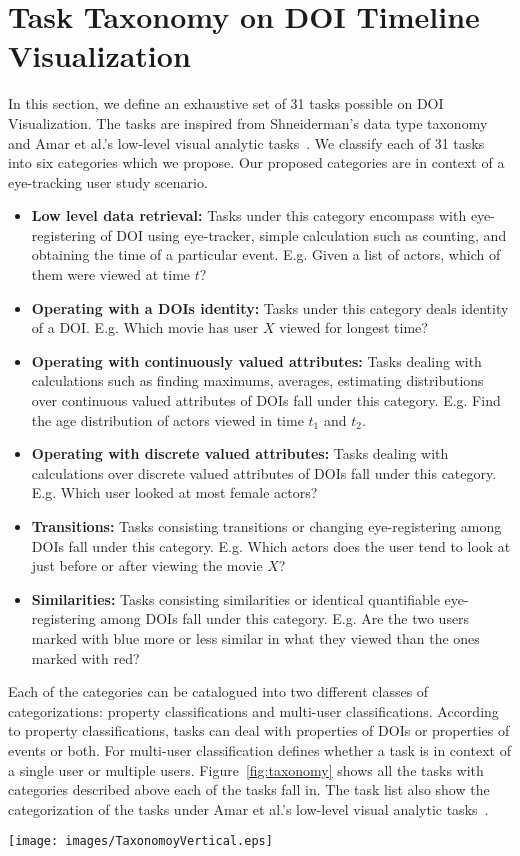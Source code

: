 \section{Task Taxonomy on DOI Timeline Visualization}
\label{sec:Taxonomy}

In this section, we define an exhaustive set of 31 tasks possible on  DOI Visualization. The tasks are inspired from Shneiderman's data type taxonomy~\cite{shneiderman1996eyes} and Amar et al.'s low-level visual analytic tasks~\cite{amar2005low}. We classify each of 31 tasks into six categories which we propose. Our proposed categories are in context of a eye-tracking user study scenario. 
\begin{itemize}
	\item \textbf{Low level data retrieval:} Tasks under this category encompass with eye-registering of DOI using eye-tracker, simple calculation such as counting, and obtaining the time of a particular event. E.g. Given a list of actors, which of them were viewed at time $t$?
	\item \textbf{Operating with a DOIs identity:} Tasks under this category deals identity of a DOI. E.g. Which movie has user $X$ viewed for longest time?
	\item \textbf{Operating with continuously valued attributes:} Tasks dealing with calculations such as finding maximums, averages, estimating distributions over continuous valued attributes of DOIs fall under this category. E.g. Find the age distribution of actors viewed in time $t_1$ and $t_2$.
	\item \textbf{Operating with discrete valued attributes:} Tasks dealing with calculations  over discrete valued attributes of DOIs fall under this category. E.g. Which user looked at most female actors?
	\item \textbf{Transitions:} Tasks consisting transitions or changing eye-registering among DOIs fall under this category. E.g. Which actors  does the user tend to look at just before or after  viewing the movie $X$?
	\item \textbf{Similarities:} Tasks consisting similarities or identical quantifiable eye-registering among DOIs fall under this category. E.g. Are the two users marked with blue more or less similar in what they viewed than the ones marked with red?
\end{itemize} 
 Each of the categories can be catalogued into two different classes of categorizations: property classifications and multi-user classifications. According to property classifications, tasks can deal with properties of DOIs or properties of events or both. For multi-user classification defines whether a task is in context of a single user or multiple users. Figure~\ref{fig:taxonomy} shows all the tasks with categories described above each of the tasks fall in. The task list also show the categorization of the tasks under Amar et al.'s low-level visual analytic tasks~\cite{amar2005low}.

\begin{figure*}[!htb]
  \centering
  \texttt{[image: images/TaxonomoyVertical.eps]}
  \caption{\label{fig:taxonomy}%
           31 task taxonomy list for DOI-based analysis. }
\end{figure*}


